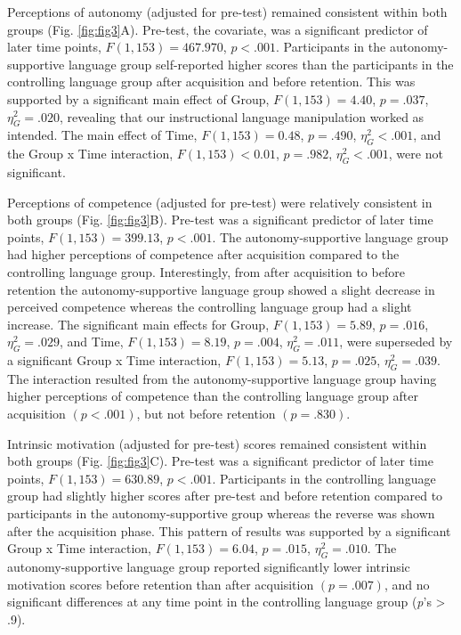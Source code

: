 \documentclass[
  doc, donotrepeattitle,floatsintext]{apa7}
\begin{document}
Perceptions of autonomy (adjusted for pre-test) remained consistent within both groups (Fig. \ref{fig:fig3}A). Pre-test, the covariate, was a significant predictor of later time points, \(F(1, 153) = 467.970\), \(p < .001\). Participants in the autonomy-supportive language group self-reported higher scores than the participants in the controlling language group after acquisition and before retention. This was supported by a significant main effect of Group, \(F(1, 153) = 4.40\), \(p = .037\), \(\eta_{G}^2 = .020\), revealing that our instructional language manipulation worked as intended. The main effect of Time, \(F(1, 153) = 0.48\), \(p = .490\), \(\eta_{G}^2 < .001\), and the Group x Time interaction, \(F(1, 153) < 0.01\), \(p = .982\), \(\eta_{G}^2 < .001\), were not significant.

Perceptions of competence (adjusted for pre-test) were relatively consistent in both groups (Fig. \ref{fig:fig3}B). Pre-test was a significant predictor of later time points, \(F(1, 153) = 399.13\), \(p < .001\). The autonomy-supportive language group had higher perceptions of competence after acquisition compared to the controlling language group. Interestingly, from after acquisition to before retention the autonomy-supportive language group showed a slight decrease in perceived competence whereas the controlling language group had a slight increase. The significant main effects for Group, \(F(1, 153) = 5.89\), \(p = .016\), \(\eta_{G}^2 = .029\), and Time, \(F(1, 153) = 8.19\), \(p = .004\), \(\eta_{G}^2 = .011\), were superseded by a significant Group x Time interaction, \(F(1, 153) = 5.13\), \(p = .025\), \(\eta_{G}^2 = .039\). The interaction resulted from the autonomy-supportive language group having higher perceptions of competence than the controlling language group after acquisition \((p < .001)\), but not before retention \((p = .830)\).

Intrinsic motivation (adjusted for pre-test) scores remained consistent within both groups (Fig. \ref{fig:fig3}C). Pre-test was a significant predictor of later time points, \(F(1, 153) = 630.89\), \(p < .001\). Participants in the controlling language group had slightly higher scores after pre-test and before retention compared to participants in the autonomy-supportive group whereas the reverse was shown after the acquisition phase. This pattern of results was supported by a significant Group x Time interaction, \(F(1, 153) = 6.04\), \(p = .015\), \(\eta_{G}^2 = .010\). The autonomy-supportive language group reported significantly lower intrinsic motivation scores before retention than after acquisition \((p = .007)\), and no significant differences at any time point in the controlling language group (\emph{p}'s \textgreater{} .9).
\end{document}
